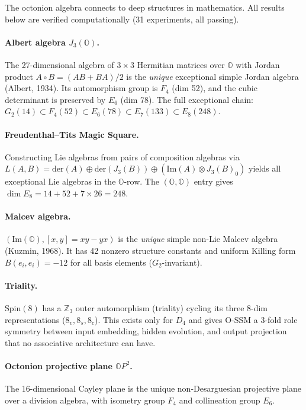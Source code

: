 \documentclass{article}
\newcommand{\Oct}{\mathbb{O}}
\begin{document}
The octonion algebra connects to deep structures in mathematics. All results below are verified computationally (31 experiments, all passing).

\paragraph{Albert algebra $J_3(\Oct)$.}
The 27-dimensional algebra of $3 \times 3$ Hermitian matrices over $\Oct$ with Jordan product $A \circ B = (AB+BA)/2$ is the \emph{unique} exceptional simple Jordan algebra (Albert, 1934). Its automorphism group is $F_4$ (dim 52), and the cubic determinant is preserved by $E_6$ (dim 78). The full exceptional chain: $G_2 (14) \subset F_4 (52) \subset E_6 (78) \subset E_7 (133) \subset E_8 (248)$.

\paragraph{Freudenthal--Tits Magic Square.}
Constructing Lie algebras from pairs of composition algebras via $L(A,B) = \mathrm{der}(A) \oplus \mathrm{der}(J_3(B)) \oplus (\mathrm{Im}(A) \otimes J_3(B)_0)$ yields all exceptional Lie algebras in the $\Oct$-row. The $(\Oct, \Oct)$ entry gives $\dim E_8 = 14 + 52 + 7 \times 26 = 248$.

\paragraph{Malcev algebra.}
$(\mathrm{Im}(\Oct), [x,y] = xy - yx)$ is the \emph{unique} simple non-Lie Malcev algebra (Kuzmin, 1968). It has 42 nonzero structure constants and uniform Killing form $B(e_i, e_i) = -12$ for all basis elements ($G_2$-invariant).

\paragraph{Triality.}
$\mathrm{Spin}(8)$ has a $\mathbb{Z}_3$ outer automorphism (triality) cycling its three 8-dim representations ($8_v, 8_s, 8_c$). This exists only for $D_4$ and gives O-SSM a 3-fold role symmetry between input embedding, hidden evolution, and output projection that no associative architecture can have.

\paragraph{Octonion projective plane $\Oct P^2$.}
The 16-dimensional Cayley plane is the unique non-Desarguesian projective plane over a division algebra, with isometry group $F_4$ and collineation group $E_6$.
\end{document}
